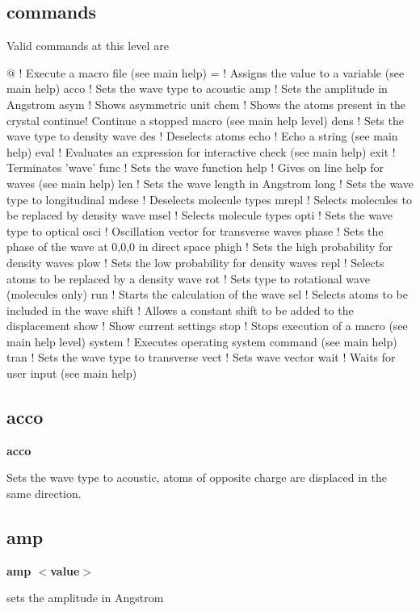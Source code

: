 \subsection*{commands}
Valid commands at this level are 
\par
\begin{MacVerbatim}
@       ! Execute a macro file (see main help)
=       ! Assigns the value to a variable (see main help)
acco    ! Sets the wave type to acoustic
amp     ! Sets the amplitude in Angstrom
asym    ! Shows asymmetric unit
chem    ! Shows the atoms present in the crystal
continue! Continue a stopped macro (see main help level)
dens    ! Sets the wave type to density wave
des     ! Deselects atoms
echo    ! Echo a string (see main help)
eval    ! Evaluates an expression for interactive check (see main help)
exit    ! Terminates 'wave'
func    ! Sets the wave function
help    ! Gives on line help for waves (see main help)
len     ! Sets the wave length in Angstrom
long    ! Sets the wave type to longitudinal
mdese   ! Deselects molecule types
mrepl   ! Selects molecules to be replaced by density wave
msel    ! Selects molecule types
opti    ! Sets the wave type to optical
osci    ! Oscillation vector for transverse waves
phase   ! Sets the phase of the wave at 0,0,0 in direct space
phigh   ! Sets the high probability for density waves
plow    ! Sets the low probability for density waves
repl    ! Selects atoms to be replaced by a density wave
rot     ! Sets type to rotational wave (molecules only)
run     ! Starts the calculation of the wave
sel     ! Selects atoms to be included in the wave
shift   ! Allows a constant shift to be added to the displacement
show    ! Show current settings
stop    ! Stops execution of a macro (see main help level)
system  ! Executes operating system command (see main help)
tran    ! Sets the wave type to transverse
vect    ! Sets wave vector
wait    ! Waits for user input (see main help)
\end{MacVerbatim}
\subsection*{acco}
{\bf acco \par }
\par
\vspace{3pt}
Sets the wave type to acoustic, atoms of opposite charge are 
displaced in the same direction. 
\subsection*{amp}
{\bf amp $ <$value$> $ \par }
\par
\vspace{3pt}
sets the amplitude in Angstrom 
